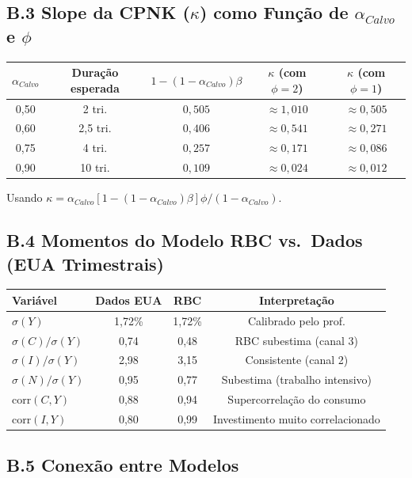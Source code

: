 \documentclass[12pt, a4paper]{article}
\begin{document}
\subsection*{B.3 Slope da CPNK ($\kappa$) como Função de $\alpha_{Calvo}$ e $\phi$}

\begin{center}
\begin{tabular}{ccccc}
\toprule
$\alpha_{Calvo}$ & Duração esperada & $1-(1-\alpha_{Calvo})\beta$ & $\kappa$ (com $\phi=2$) & $\kappa$ (com $\phi=1$) \\
\midrule
0,50 & 2 tri. & $0{,}505$ & $\approx 1{,}010$ & $\approx 0{,}505$ \\
0,60 & 2,5 tri. & $0{,}406$ & $\approx 0{,}541$ & $\approx 0{,}271$ \\
0,75 & 4 tri. & $0{,}257$ & $\approx 0{,}171$ & $\approx 0{,}086$ \\
0,90 & 10 tri. & $0{,}109$ & $\approx 0{,}024$ & $\approx 0{,}012$ \\
\bottomrule
\end{tabular}
\end{center}
Usando $\kappa = \alpha_{Calvo}[1-(1-\alpha_{Calvo})\beta]\phi/(1-\alpha_{Calvo})$.

\subsection*{B.4 Momentos do Modelo RBC vs.\ Dados (EUA Trimestrais)}

\begin{center}
\begin{tabular}{lccc}
\toprule
Variável & Dados EUA & RBC & Interpretação \\
\midrule
$\sigma(Y)$ & 1,72\% & 1,72\% & Calibrado pelo prof. \\
$\sigma(C)/\sigma(Y)$ & 0,74 & 0,48 & RBC subestima (canal 3) \\
$\sigma(I)/\sigma(Y)$ & 2,98 & 3,15 & Consistente (canal 2) \\
$\sigma(N)/\sigma(Y)$ & 0,95 & 0,77 & Subestima (trabalho intensivo) \\
$\text{corr}(C,Y)$ & 0,88 & 0,94 & Supercorrelação do consumo \\
$\text{corr}(I,Y)$ & 0,80 & 0,99 & Investimento muito correlacionado \\
\bottomrule
\end{tabular}
\end{center}

\subsection*{B.5 Conexão entre Modelos}
\end{document}
